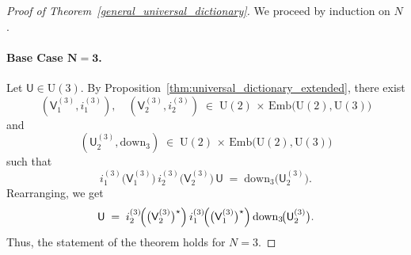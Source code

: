 \documentclass[a4paper,11pt]{article}
\newcommand{\rU}{\mathsf{U}}
\newcommand{\rV}{\mathsf{V}}
\begin{document}
\begin{appendices}
  \bigskip
  
  \begin{proof}[Proof of Theorem~\ref{general_universal_dictionary}]
We proceed by induction on \(N\).

\paragraph{Base Case \(\boldsymbol{N=3}\).}
Let \(\rU \in \mathrm{U}(3)\). By Proposition~\ref{thm:universal_dictionary_extended}, 
there exist 
\[
(\rV_1^{(3)}, i_1^{(3)}), \quad
(\rV_2^{(3)}, i_2^{(3)}) 
\;\in\; 
\mathrm{U}(2) \,\times\, \mathrm{Emb}\!\bigl(\mathrm{U}(2), \mathrm{U}(3)\bigr)
\]
and 
\[
(\rU_{2}^{(3)}, \mathrm{down}_3) 
\;\in\; 
\mathrm{U}(2) \,\times\, \mathrm{Emb}\!\bigl(\mathrm{U}(2), \mathrm{U}(3)\bigr)
\]
such that
\[
i_{1}^{(3)}\!\bigl(\rV_{1}^{(3)}\bigr)\,
i_{2}^{(3)}\!\bigl(\rV_{2}^{(3)}\bigr)\,\rU 
\;=\; 
\mathrm{down}_3\!\bigl(\rU_{2}^{(3)}\bigr).
\]
Rearranging, we get
\[
\rU 
\;=\;
i_{2}^{(3)}\!\Bigl(\bigl(\rV_{2}^{(3)}\bigr)^{\star}\Bigr)\,
i_{1}^{(3)}\!\Bigl(\bigl(\rV_{1}^{(3)}\bigr)^{\star}\Bigr)\,
\mathrm{down}_3\!\bigl(\rU_{2}^{(3)}\bigr).
\]
Thus, the statement of the theorem holds for \(N = 3\).


\end{proof}
\end{appendices}
\end{document}
